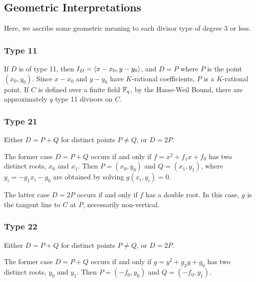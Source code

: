 
\subsection{Geometric Interpretations}

Here, we ascribe some geometric meaning to each divisor type of degree 3 or less.


\subsubsection{Type 11}
  If $D$ is of type 11, then $I_D = \left\langle x - x_0, y - y_0 \right\rangle$, and $D = P$ where $P$ is the point $(x_0, y_0)$.
  Since $x - x_0$ and $y - y_0$ have $K$-rational coefficients, $P$ is a $K$-rational point.
  If $C$ is defined over a finite field $\mathbb{F}_q$,
  by the Hasse-Weil Bound, there are approximately $q$ type 11 divisors on $C$.

\subsubsection{Type 21}
  Either $D = P + Q$ for distinct points $P \neq Q$, or $D = 2P$.
  
  The former case $D = P + Q$ occurs if and only if $f = x^2 + f_1x + f_0$ has two distinct roots, $x_0$ and $x_1$.
  Then $P = (x_0, y_0)$ and $Q = (x_1, y_1)$, where $y_i = -g_1x_i - g_0$ are obtained by solving $g(x_i, y_i) = 0$.
  
  The latter case $D = 2P$ occurs if and only if $f$ has a double root.
  In this case, $g$ is the tangent line to $C$ at $P$, necessarily non-vertical.

\subsubsection{Type 22}
  Either $D = P + Q$ for distinct points $P \neq Q$, or $D = 2P$.

  The former case $D = P + Q$ occurs if and only if $g = y^2 + g_2y + g_0$ has two distinct roots, $y_0$ and $y_1$.
  Then $P = (-f_0, y_0)$ and $Q = (-f_0, y_1)$.

